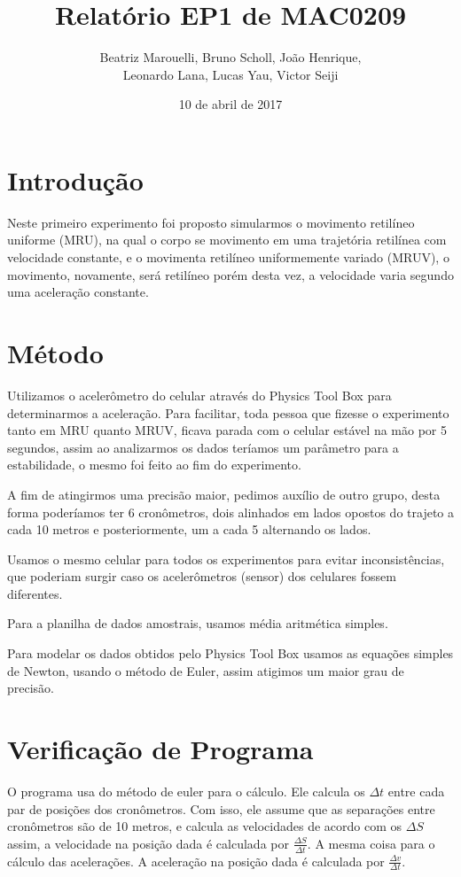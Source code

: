 \documentclass[a4paper, 12pt]{article}
\title{Relatório EP1 de MAC0209}
\author{Beatriz Marouelli, Bruno Scholl, João Henrique, 
\\ Leonardo Lana, Lucas Yau, Victor Seiji}
\date{10 de abril de 2017}
\begin{document}
\maketitle

\section*{Introdução}
Neste primeiro experimento foi proposto simularmos o movimento retilíneo
uniforme (MRU), na qual o corpo se movimento em uma trajetória retilínea com
velocidade constante, e o movimenta retilíneo uniformemente variado (MRUV),
o movimento, novamente, será retilíneo porém desta vez, a velocidade varia
segundo uma aceleração constante.

\section*{Método}
Utilizamos o acelerômetro do celular através do Physics Tool Box para
determinarmos a aceleração. Para facilitar, toda pessoa que fizesse o experimento 
tanto em MRU quanto MRUV, ficava parada com o celular estável na mão por 5 segundos, 
assim ao analizarmos os dados teríamos um parâmetro para a estabilidade, o mesmo 
foi feito ao fim do experimento.

A fim de atingirmos uma precisão maior, pedimos auxílio de outro grupo, desta
forma poderíamos ter 6 cronômetros, dois alinhados em lados opostos do trajeto
a cada 10 metros e posteriormente, um a cada 5 alternando os lados.

Usamos o mesmo celular para todos os experimentos para evitar inconsistências,
que poderiam surgir caso os acelerômetros (sensor) dos celulares fossem diferentes.

Para a planilha de dados amostrais, usamos média aritmética simples.

Para modelar os dados obtidos pelo Physics Tool Box usamos as equações simples
de Newton, usando o método de Euler, assim atigimos um maior grau de precisão.

\section*{Verificação de Programa}
O programa usa do método de euler para o cálculo. Ele calcula os 
$\Delta t$ entre cada par de posições dos cronômetros. Com isso, ele assume
que as separações entre cronômetros são de 10 metros, e calcula as velocidades de
acordo com os $\Delta S$ assim, a velocidade na posição dada
é calculada por $\frac{\Delta S}{\Delta t}$.
A mesma coisa para o cálculo das acelerações. A aceleração na posição dada é
calculada por $\frac{\Delta v}{\Delta t}$.
\end{document}
